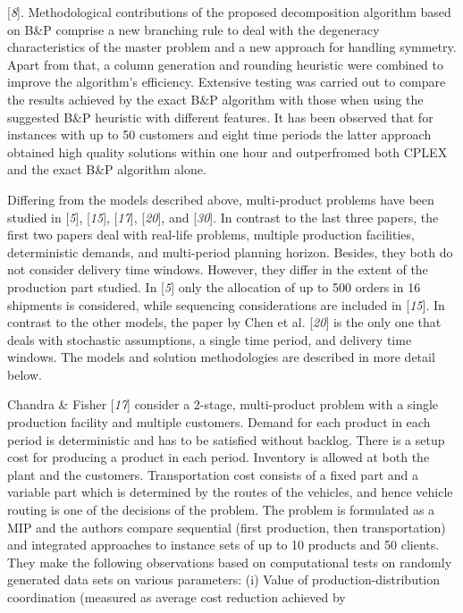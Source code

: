  [\textit{8}]. Methodological contributions of the
 proposed decomposition algorithm based on B\&P comprise a new branching rule to
 deal with the degeneracy characteristics of the master problem and a new approach for
 handling symmetry. Apart from that, a column generation and rounding heuristic were
 combined to improve the algorithm's efficiency. Extensive testing was carried out to
 compare the results achieved by the exact B\&P algorithm with those when using the
 suggested B\&P heuristic with different features. It has been observed that for
 instances with up to 50 customers and eight time periods the latter approach obtained
 high quality solutions within one hour and outperfromed both CPLEX and the exact
 B\&P algorithm alone.\par Differing from the models described above, multi-product problems have been studied
 in [\textit{5}], [\textit{15}], [\textit{17}], [\textit{20}], and [\textit{30}]. In contrast
 to the last three papers, the first two papers deal with real-life problems, multiple
 production facilities, deterministic demands, and multi-period planning horizon.
 Besides, they both do not consider delivery time windows. However, they differ in the
 extent of the production part studied. In [\textit{5}]
 only the allocation of up to 500 orders in 16 shipments is considered, while
 sequencing considerations are included in [\textit{15}]. In contrast to the other models, the paper by Chen et al. [\textit{20}] is the only one that deals with stochastic
 assumptions, a single time period, and delivery time windows. The models and solution
 methodologies are described in more detail below.\par Chandra \& Fisher [\textit{17}] consider a 2-stage,
 multi-product problem with a single production facility and multiple customers.
 Demand for each product in each period is deterministic and has to be satisfied
 without backlog. There is a setup cost for producing a product in each period.
 Inventory is allowed at both the plant and the customers. Transportation cost
 consists of a fixed part and a variable part which is determined by the routes of the
 vehicles, and hence vehicle routing is one of the decisions of the problem. The
 problem is formulated as a MIP and the authors compare sequential (first production,
 then transportation) and integrated approaches to instance sets of up to 10 products
 and 50 clients. They make the following observations based on computational tests on
 randomly generated data sets on various parameters: (i) Value of
 production-distribution coordination (measured as average cost reduction achieved by
